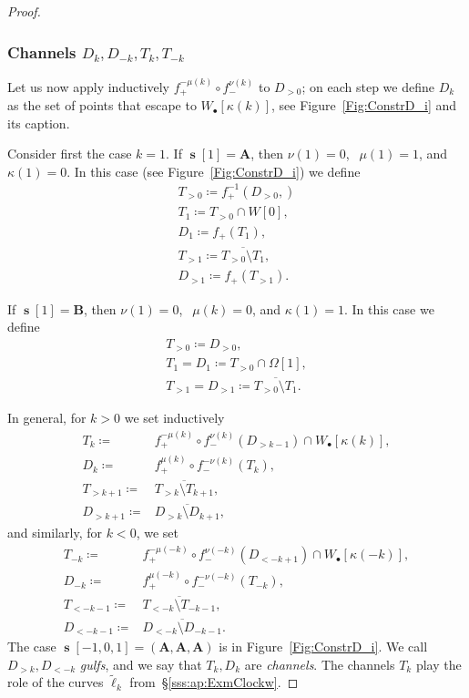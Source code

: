 \documentclass[]{amsart}
\renewcommand{\sp}{{\ \ }}
\newcommand\seq{{\operatorname{\mathbf s}}}
\newcommand\oseq{{\bullet}}
\newcommand{\A}{\mathbf A}
\newcommand{\B}{\mathbf B}
\newcommand\inn{{\Omega}}
\theoremstyle{remark}
\numberwithin{equation}{section}
\theoremstyle{definition}
\begin{document}
\begin{proof}
\subsubsection{Channels $D_{k},D_{-k},T_{k},T_{-k}$} Let us now apply inductively $f_{+}^ {-\mu(k)}\circ   f_{-}^ {\nu(k)}$ to $D_{>0}$; on each step we define $D_k$ as the set of points that escape to $W_\oseq [\kappa(k)]$, see Figure~\ref{Fig:ConstrD_i} and its caption. 

Consider first the case $k=1$. If $\seq[1]=\A$, then $\nu(1)=0$, $\sp \mu(1)=1$, and $\kappa(1)=0$. In this case (see Figure~\ref{Fig:ConstrD_i}) we define 
\begin{align*}
T_{>0}\coloneqq f_+^{-1}(D_{>0},)\\
T_1\coloneqq T_{>0}\cap W[0],\\
 D_1\coloneqq  f_+(T_1),\\
T_{>1}\coloneqq \overline{T_{>0}\setminus T_1},\\
D_{>1}\coloneqq  f_+(T_{>1}).
\end{align*}

If $\seq[1]=\B$, then $\nu(1)=0$, $\sp \mu(k)=0$, and $\kappa(1)=1$. In this case we define
\begin{align*}
T_{>0}\coloneqq D_{>0},\\
T_1=D_1\coloneqq T_{>0}\cap \inn[1],\\
T_{>1}=D_{>1}\coloneqq \overline{T_{>0}\setminus T_1}.
\end{align*} 

In general, for $k>0$ we set inductively 
\begin{align*}
T_k\coloneqq  &   f_{+}^ {-\mu(k)}\circ   f_{-}^ {\nu(k)} (D_{>k-1}) \cap W_{\oseq }[\kappa(k)],\\
D_{k}\coloneqq  & f_{+}^ {\mu(k)}\circ   f_{-}^ {-\nu(k)} \left(T_k \right),\\
T_{>k+1} \coloneqq& \overline{T_{>k}\setminus T_{k+1}},\\
D_{>k+1} \coloneqq& \overline{D_{>k}\setminus D_{k+1}},
\end{align*}
and similarly, for $k<0$, we set
\begin{align*}
T_{-k}\coloneqq  &   f_{+}^ {-\mu(-k)}\circ   f_{-}^ {\nu(-k)} (D_{<-k+1}) \cap W_{\oseq }[\kappa(-k)],\\
D_{-k}\coloneqq  & f_{+}^ {\mu(-k)}\circ   f_{-}^ {-\nu(-k)} \left(T_{-k} \right),\\
T_{<-k-1} \coloneqq& \overline{T_{<-k}\setminus T_{-k-1}},\\
D_{<-k-1} \coloneqq& \overline{D_{<-k}\setminus D_{-k-1}}.
\end{align*}
The case $\seq[-1,0,1]=(\A,\A,\A)$ is in Figure~\ref{Fig:ConstrD_i}. We call $D_{>k}, D_{<-k}$ \emph{gulfs}, and we say that $T_k, D_k$ are \emph{channels}. The channels $T_k$ play the role of the curves $\widetilde \ell_k$ from~\S\ref{sss:ap:ExmClockw}. 


\end{proof}
\end{document}
